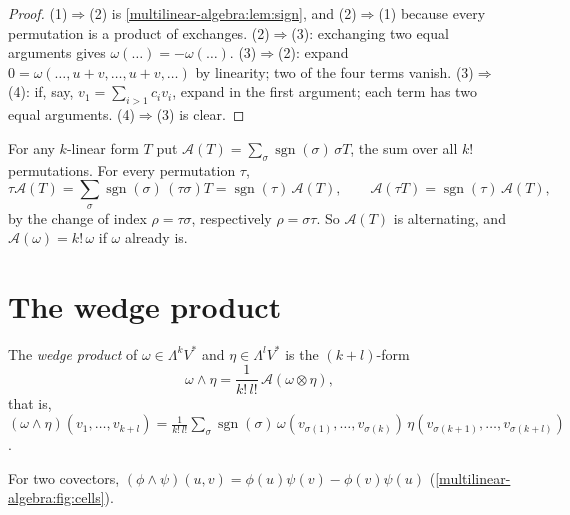 \begin{notechapter}
\begin{proof}
(1)$\Rightarrow$(2) is \cref{multilinear-algebra:lem:sign}, and
(2)$\Rightarrow$(1) because every permutation is a product of
exchanges. (2)$\Rightarrow$(3): exchanging two equal arguments gives
$\omega(\dots) = -\omega(\dots)$. (3)$\Rightarrow$(2): expand
$0 = \omega(\dots,u + v,\dots,u + v,\dots)$ by linearity; two of the
four terms vanish. (3)$\Rightarrow$(4): if, say,
$v_1 = \sum_{i>1}c_iv_i$, expand in the first argument; each term has
two equal arguments. (4)$\Rightarrow$(3) is clear.
\end{proof}

For any $k$-linear form $T$ put
$\mathcal A(T) = \sum_\sigma\operatorname{sgn}(\sigma)\,\sigma T$, the
sum over all $k!$ permutations. For every permutation $\tau$,
\[
  \tau\mathcal A(T)
  = \sum_\sigma\operatorname{sgn}(\sigma)\,(\tau\sigma)T
  = \operatorname{sgn}(\tau)\,\mathcal A(T) , \qquad
  \mathcal A(\tau T) = \operatorname{sgn}(\tau)\,\mathcal A(T) ,
\]
by the change of index $\rho = \tau\sigma$, respectively
$\rho = \sigma\tau$. So $\mathcal A(T)$ is alternating, and
$\mathcal A(\omega) = k!\,\omega$ if $\omega$ already is.

\section{The wedge product}\label{multilinear-algebra:sec:wedge}

\begin{definition}\label{multilinear-algebra:def:wedge}
The \emph{wedge product} of $\omega\in\Lambda^kV^*$ and
$\eta\in\Lambda^lV^*$ is the $(k + l)$-form
\[
  \omega\wedge\eta = \frac1{k!\,l!}\,\mathcal A(\omega\otimes\eta) ,
\]
that is,
$(\omega\wedge\eta)(v_1,\dots,v_{k+l}) = \frac1{k!\,l!}\sum_\sigma
\operatorname{sgn}(\sigma)\,\omega(v_{\sigma(1)},\dots,v_{\sigma(k)})\,
\eta(v_{\sigma(k+1)},\dots,v_{\sigma(k+l)})$.
\end{definition}

For two covectors,
$(\phi\wedge\psi)(u, v) = \phi(u)\psi(v) - \phi(v)\psi(u)$
(\cref{multilinear-algebra:fig:cells}).


\end{notechapter}
